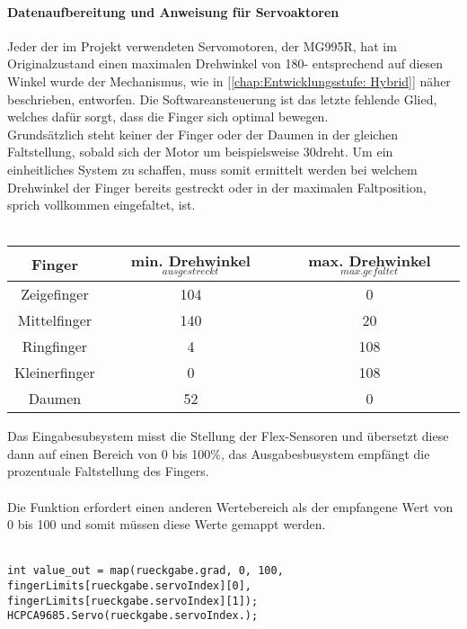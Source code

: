 \documentclass[titlepage,12pt,twoside]{article}
\begin{document}
\paragraph{Datenaufbereitung und Anweisung für Servoaktoren}
\label{par:Datenaufbereitung und Anweisung für Servoaktoren}
\hfill \break
\hfill \break
Jeder der im Projekt verwendeten Servomotoren, der MG995R, hat im Originalzustand einen maximalen Drehwinkel von 180\textdegree - entsprechend auf diesen 
Winkel wurde der Mechanismus, wie in [\textcolor{blue}{\autoref{chap:Entwicklungsstufe: Hybrid}}] näher beschrieben, entworfen. Die Softwareansteuerung ist das letzte 
fehlende Glied, welches dafür sorgt, dass die Finger sich optimal bewegen. \\
Grundsätzlich steht keiner der Finger oder der Daumen in der gleichen Faltstellung, sobald sich der Motor um beispielsweise 30\textdegree dreht. Um ein einheitliches 
System zu schaffen, muss somit ermittelt werden bei welchem Drehwinkel der Finger bereits gestreckt oder in der maximalen Faltposition, sprich vollkommen 
eingefaltet, ist. \\
\\
\begin{table}[H]
    \centering
    \begin{tabular}{|c|c|c|}  %
        \hline
        \textbf{Finger} & \textbf{min. Drehwinkel$_{ausgestreckt}$} & \textbf{max. Drehwinkel$_{max. gefaltet}$} \\
        \hline
		Zeigefinger & 104\textdegree & 0\textdegree \\
		\hline
		Mittelfinger & 140\textdegree & 20\textdegree \\
		\hline
		Ringfinger & 4\textdegree & 108\textdegree \\
		\hline
		Kleinerfinger & 0\textdegree & 108\textdegree \\
		\hline
		Daumen & 52\textdegree & 0\textdegree \\
		\hline
    \end{tabular}
    \label{tab:Servo Drehwinkel}
\end{table}
\hfill \break
Das Eingabesubsystem misst die Stellung der Flex-Sensoren und übersetzt diese dann auf einen Bereich von 0 bis 100\%, das Ausgabesbusystem empfängt 
die prozentuale Faltstellung des Fingers. \\
\\
Die Funktion  erfordert einen anderen Wertebereich als der empfangene Wert von 0 bis 100 und somit müssen diese Werte gemappt werden. \\
\\
\footnotesize
\begin{lstlisting}
int value_out = map(rueckgabe.grad, 0, 100, fingerLimits[rueckgabe.servoIndex][0], 
fingerLimits[rueckgabe.servoIndex][1]);
HCPCA9685.Servo(rueckgabe.servoIndex.);
\end{lstlisting}
\hfill \break
\normalsize
\end{document}
